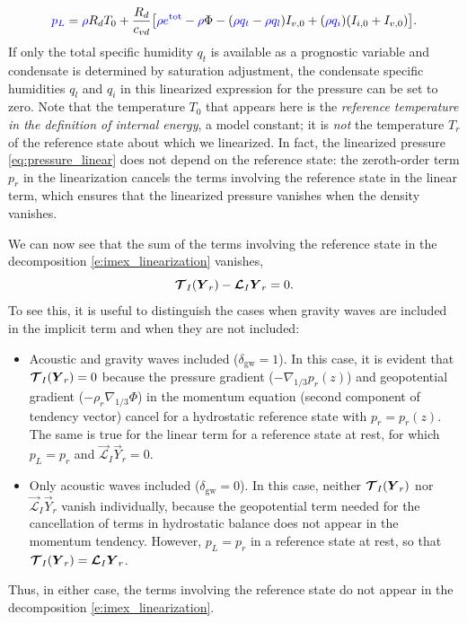 \documentclass{report}
\numberwithin{equation}{section}
\begin{document}
\begin{equation}\label{eq:pressure_linear}
\textcolor{blue}{p_L} = \textcolor{blue}{\rho} R_d T_0 + \frac{R_d}{c_{vd}} \bigl[ \textcolor{blue}{\rho e^{\mathrm{tot}}} - \textcolor{blue}{\rho} \Phi - (\textcolor{blue}{\rho q_t} - \textcolor{blue}{\rho q_l})I_{v,0} + (\textcolor{blue}{\rho q_i}) (I_{i,0} + I_{v,0}) \bigr].
\end{equation}
If only the total specific humidity $q_t$ is available as a prognostic variable and condensate is determined by saturation adjustment, the condensate specific humidities $q_l$ and $q_i$ in this linearized expression for the pressure can be set to zero. Note that the temperature $T_0$ that appears here is the \emph{reference temperature in the definition of internal energy}, a model constant; it is \emph{not} the temperature $T_r$ of the reference state about which we linearized. In fact, the linearized pressure \eqref{eq:pressure_linear} does not depend on the reference state: the zeroth-order term $p_r$ in the linearization cancels the terms involving the reference state in the linear term, which ensures that the linearized pressure vanishes when the density vanishes. 

We can now see that the sum of the terms involving the reference state in the decomposition \eqref{e:imex_linearization} vanishes,
\[
\boldsymbol{{\mathcal{T}}}_I(\boldsymbol{{Y}}_r) - \boldsymbol{{\mathcal{L}}}_I \boldsymbol{{Y}}_r = 0.
\]
To see this, it is useful to distinguish the cases when gravity waves are included in the implicit term and when they are not included: 
\begin{itemize}
    \item Acoustic and gravity waves included ($\delta_{\mathrm{gw}}=1$). In this case, it is evident that $\boldsymbol{{\mathcal{T}}}_I(\boldsymbol{{Y}}_r)=0$ because the pressure gradient ($-\nabla_{1/3} p_r(z)$) and geopotential gradient ($-\rho_r\nabla_{1/3}\Phi$) in the momentum equation (second component of tendency vector) cancel for a hydrostatic reference state with $p_r = p_r(z)$. The same is true for the linear term for a reference state at rest, for which $p_L = p_r$ and $\vec{\mathcal{L}}_I \vec{Y}_r = 0$. 
    \item Only acoustic waves included ($\delta_{\mathrm{gw}}=0$). In this case, neither $\boldsymbol{{\mathcal{T}}}_I(\boldsymbol{{Y}}_r)$ nor $\vec{\mathcal{L}}_I\vec{Y}_r$ vanish individually, because the geopotential term needed for the cancellation of terms in hydrostatic balance does not appear in the momentum tendency. However, $p_L = p_r$ in a reference state at rest, so that $\boldsymbol{{\mathcal{T}}}_I(\boldsymbol{{Y}}_r) = \boldsymbol{{\mathcal{L}}}_I\boldsymbol{{Y}}_r$.
\end{itemize}
Thus, in either case, the terms involving the reference state do not appear  in the decomposition \eqref{e:imex_linearization}. 
\end{document}

